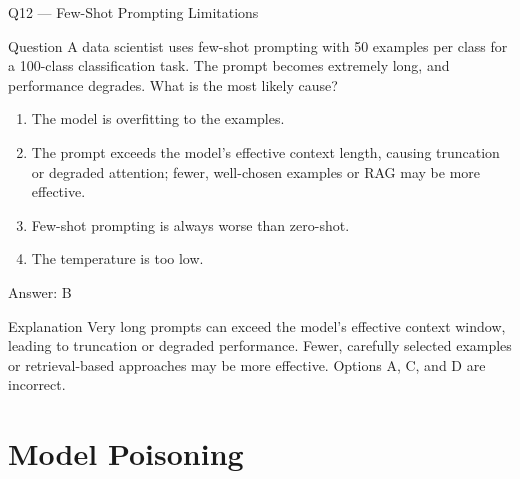 \documentclass[aspectratio=169,8pt]{beamer}
\begin{document}
	\begin{frame}{Q12 --- Few-Shot Prompting Limitations}
		\begin{block}{Question}
			A data scientist uses few-shot prompting with 50 examples per class for a 100-class classification task. The prompt becomes extremely long, and performance degrades. What is the most likely cause?
			\begin{enumerate}
				\item The model is overfitting to the examples.
				\item The prompt exceeds the model's effective context length, causing truncation or degraded attention; fewer, well-chosen examples or RAG may be more effective.
				\item Few-shot prompting is always worse than zero-shot.
				\item The temperature is too low.
			\end{enumerate}
		\end{block}
		\begin{exampleblock}{Answer: B}\end{exampleblock}
		\begin{block}{Explanation}
			Very long prompts can exceed the model's effective context window, leading to truncation or degraded performance. Fewer, carefully selected examples or retrieval-based approaches may be more effective. Options A, C, and D are incorrect.
		\end{block}
	\end{frame}
	
	\section{Model Poisoning}
	
\end{document}

